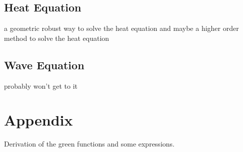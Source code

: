 \documentclass[a4paper,12pt]{article}
\begin{document}
\subsection{Heat Equation}
a geometric robust way to solve the heat equation and maybe a higher order method to solve
the heat equation

\subsection{Wave Equation}
probably won't get to it

\newpage
\printbibliography
\newpage

\section{Appendix}
Derivation of the green functions and some expressions.
\end{document}
